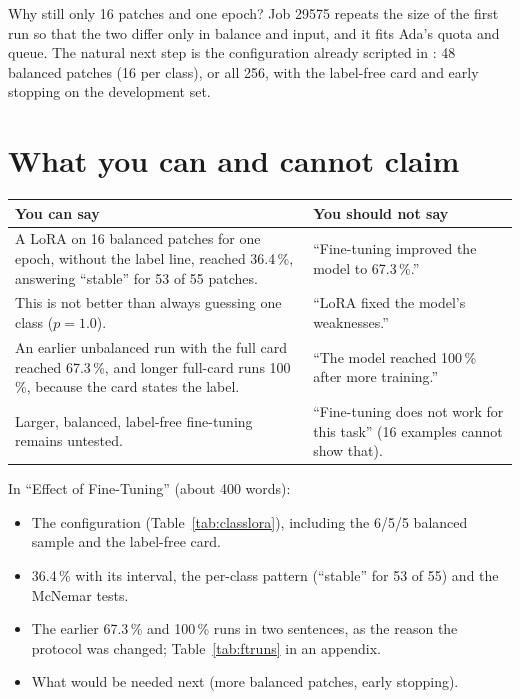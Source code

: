 \begin{whybox}
Why still only 16 patches and one epoch? Job 29575 repeats the size of the first run so that the two differ only in balance and input, and it fits Ada's quota and queue. The natural next step is the configuration already scripted in : 48 balanced patches (16 per class), or all 256, with the label-free card and early stopping on the development set.
\end{whybox}

\section{What you can and cannot claim}

\begin{table}[H]
\centering
\small
\begin{tabularx}{\textwidth}{YY}
\toprule
\textbf{You can say} & \textbf{You should not say} \\
\midrule
A LoRA on 16 balanced patches for one epoch, without the label line, reached 36.4\,\%, answering ``stable'' for 53 of 55 patches. & ``Fine-tuning improved the model to 67.3\,\%.'' \\
This is not better than always guessing one class ($p = 1.0$). & ``LoRA fixed the model's weaknesses.'' \\
An earlier unbalanced run with the full card reached 67.3\,\%, and longer full-card runs 100\,\%, because the card states the label. & ``The model reached 100\,\% after more training.'' \\
Larger, balanced, label-free fine-tuning remains untested. & ``Fine-tuning does not work for this task'' (16 examples cannot show that). \\
\bottomrule
\end{tabularx}
\end{table}

\begin{foryourreport}
In ``Effect of Fine-Tuning'' (about 400 words):
\begin{itemize}
  \item The configuration (Table~\ref{tab:classlora}), including the 6/5/5 balanced sample and the label-free card.
  \item 36.4\,\% with its interval, the per-class pattern (``stable'' for 53 of 55) and the McNemar tests.
  \item The earlier 67.3\,\% and 100\,\% runs in two sentences, as the reason the protocol was changed; Table~\ref{tab:ftruns} in an appendix.
  \item What would be needed next (more balanced patches, early stopping).
\end{itemize}
\end{foryourreport}

